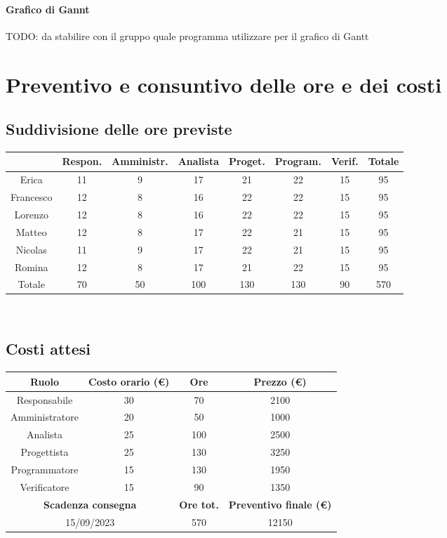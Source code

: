 \documentclass[a4paper, 12pt]{article}
\begin{document}
\paragraph{Grafico di Gannt}

TODO: da stabilire con il gruppo quale programma utilizzare per il grafico di Gantt

\section{Preventivo e consuntivo delle ore e dei costi}

\subsection{Suddivisione delle ore previste}

\begin{tabular}{|c|c|c|c|c|c|c|c|}
    \hline
    \textbf{} & \textbf{Respon.} & \textbf{Amministr.} & \textbf{Analista} & \textbf{Proget.} & \textbf{Program.} & \textbf{Verif.} & \textbf{Totale}\\
    \hline
    Erica & 11 & 9 & 17 & 21 & 22 & 15 & 95\\
    \hline
    Francesco & 12 & 8 & 16 & 22 & 22 & 15 & 95\\
    \hline
    Lorenzo & 12 & 8 & 16 & 22 & 22 & 15 & 95\\
    \hline
    Matteo & 12 & 8 & 17 & 22 & 21 & 15 & 95\\
    \hline
    Nicolas & 11 & 9 & 17 & 22 & 21 & 15 & 95\\
    \hline
    Romina & 12 & 8 & 17 & 21 & 22 & 15 & 95\\
    \hline
    Totale & 70 & 50 & 100 & 130 & 130 & 90 & 570\\
    \hline
\end{tabular}\\[8pt]

\subsection{Costi attesi}

\begin{tabular}{|c|c|c|c|}
    \hline
    \textbf{Ruolo} & \textbf{Costo orario (\euro)} & \textbf{Ore} & \textbf{Prezzo (\euro)}\\
    \hline
    Responsabile & 30 & 70 & 2100\\
    \hline
    Amministratore & 20 & 50 & 1000\\
    \hline
    Analista & 25 & 100 & 2500\\
    \hline
    Progettista & 25 & 130 & 3250\\
    \hline
    Programmatore & 15 & 130 & 1950\\
    \hline
    Verificatore & 15 & 90 & 1350\\
    \hline\hline
    \multicolumn{2}{|c|}{\textbf{Scadenza consegna}} & \textbf{Ore tot.} & \textbf{Preventivo finale (\euro)}\\
    \hline
    \multicolumn{2}{|c|}{15/09/2023} & 570 & 12150\\
    \hline
\end{tabular}\\[8pt]
\end{document}
